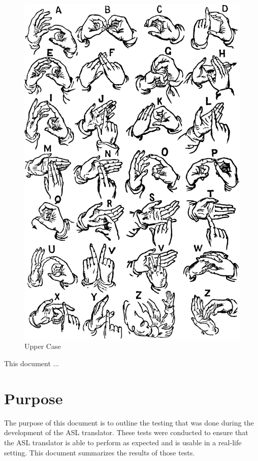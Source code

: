 \documentclass[12pt, titlepage]{article}
\begin{document}
\begin{figure}[H] 
\centering
\includegraphics[width=\textwidth,height=0.8\textheight,keepaspectratio]{upper_cases.PNG} 
\caption{Upper Case} 
\label{Fig.Upper Case} 
\end{figure}

\newpage

\tableofcontents

\listoftables %

\listoffigures %

\newpage


This document ...

\section{Purpose}
The purpose of this document is to outline the testing that was done during the development of the ASL translator. These tests were conducted to ensure that the ASL translator is able to perform as expected and is usable in a real-life setting. This document summarizes the results of those tests.
\end{document}
